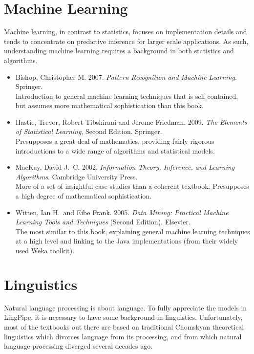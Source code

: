 \section{Machine Learning}

\noindent
Machine learning, in contrast to statistics, focuses on implementation
details and tends to concentrate on predictive inference for larger
scale applications.  As such, understanding machine learning requires
a background in both statistics and algorithms.

\begin{itemize}
\item
Bishop, Christopher M.
2007.
{\it Pattern Recognition and Machine Learning}.
Springer.
\\
{\footnotesize Introduction to general machine learning
techniques that is self contained, but assumes more mathematical
sophistication than this book.}
%
\item
Hastie, Trevor, Robert Tibshirani and Jerome Friedman.
2009.
{\it The Elements of Statistical Learning}, Second Edition.
Springer.
\\
{\footnotesize Presupposes a great deal of mathematics, providing
fairly rigorous introductions to a wide range of algorithms and
statistical models.}
%
\item
MacKay, David J.~C.
2002.
{\it Information Theory, Inference, and Learning Algorithms}.
Cambridge University Press.
\\
{\footnotesize More of a set of insightful case studies than a coherent textbook.
Presupposes a high degree of mathematical sophistication.}
%
\item 
Witten, Ian H.\ and Eibe Frank. 2005. {\it Data Mining: Practical
Machine Learning Tools and Techniques} (Second Edition).  Elsevier.
\\
{\footnotesize The most similar to this book, explaining general machine
learning techniques at a high level and 
linking to the Java implementations (from their widely used Weka toolkit).}
%
\end{itemize}




\section{Linguistics}

\noindent
Natural language processing is about language.  To fully appreciate
the models in LingPipe, it is necessary to have some background in
linguistics.  Unfortunately, most of the textbooks out there are based
on traditional Chomskyan theoretical linguistics which divorces
language from its processing, and from which natural language
processing diverged several decades ago.

